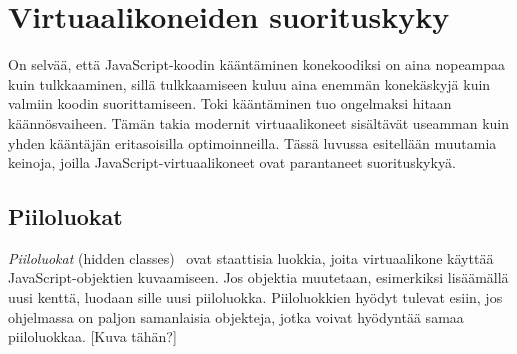 \section{Virtuaalikoneiden suorituskyky}

On selvää, että JavaScript-koodin kääntäminen konekoodiksi on aina nopeampaa kuin tulkkaaminen, sillä tulkkaamiseen kuluu aina enemmän konekäskyjä kuin valmiin koodin suorittamiseen. Toki kääntäminen tuo ongelmaksi hitaan käännösvaiheen. Tämän takia modernit virtuaalikoneet sisältävät useamman kuin yhden kääntäjän eritasoisilla optimoinneilla. Tässä luvussa esitellään muutamia keinoja, joilla JavaScript-virtuaalikoneet ovat parantaneet suorituskykyä.

\subsection{Piiloluokat}

\textit{Piiloluokat} (hidden classes)~\cite{v8design} ovat staattisia luokkia, joita virtuaalikone käyttää JavaScript-objektien kuvaamiseen. Jos objektia muutetaan, esimerkiksi lisäämällä uusi kenttä, luodaan sille uusi piiloluokka. Piiloluokkien hyödyt tulevat esiin, jos ohjelmassa on paljon samanlaisia objekteja, jotka voivat hyödyntää samaa piiloluokkaa. [Kuva tähän?]